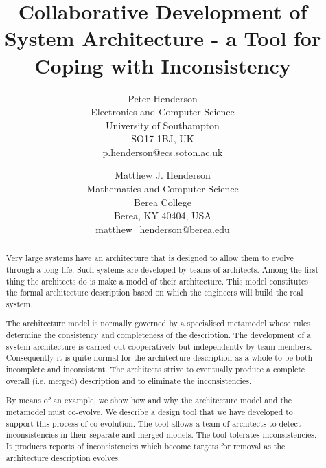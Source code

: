 \documentclass[times, 10pt,twocolumn]{article}
\begin{document}
\title{Collaborative Development of System Architecture - a Tool for Coping with Inconsistency}

\author{Peter Henderson\\
Electronics and Computer Science \\
University of Southampton\\  
SO17 1BJ, UK\\ p.henderson@ecs.soton.ac.uk\\
\and
Matthew J. Henderson\\
Mathematics and Computer Science \\ 
Berea College\\
Berea, KY 40404, USA \\ 
matthew\_henderson@berea.edu\\
}


\maketitle
\thispagestyle{empty}

\begin{abstract}
Very large systems have an architecture that is designed to allow them to evolve through a long life. Such systems are developed by teams of architects. Among the first thing the architects do is make a model of their architecture. This model constitutes the formal architecture description based on which the engineers will build the real system.

The architecture model is normally governed by a specialised metamodel whose rules determine the consistency and completeness of the description. The development of a system architecture is carried out cooperatively but independently by team members. Consequently it is quite normal for the architecture description as a whole to be both incomplete and inconsistent. The architects strive to eventually produce a complete overall (i.e. merged) description and to eliminate the inconsistencies. 

By means of an example, we show how and why the architecture model and the metamodel must co-evolve. We describe a design tool that we have developed to support this process of co-evolution. The tool allows a team of architects to detect inconsistencies in their separate and merged models. The tool tolerates inconsistencies. It produces reports of inconsistencies which become targets for removal as the architecture description evolves.

\end{abstract}
\end{document}
